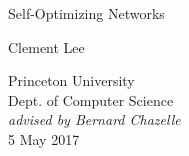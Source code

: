 \begin{titlepage}
\begin{center}
\null
\vfill

{\fontsize{40}{40}
\selectfont
Self-Optimizing Networks}
\vspace*{2\baselineskip}

{\huge Clement Lee}

\vspace*{12\baselineskip}

{\Large
Princeton University\\
\vspace{.5\baselineskip}
Dept. of Computer Science\\
\vspace{.5\baselineskip}
\emph{advised by Bernard Chazelle}\\
\vspace{2\baselineskip}
5 May 2017}

\vfill
\end{center}
\end{titlepage}